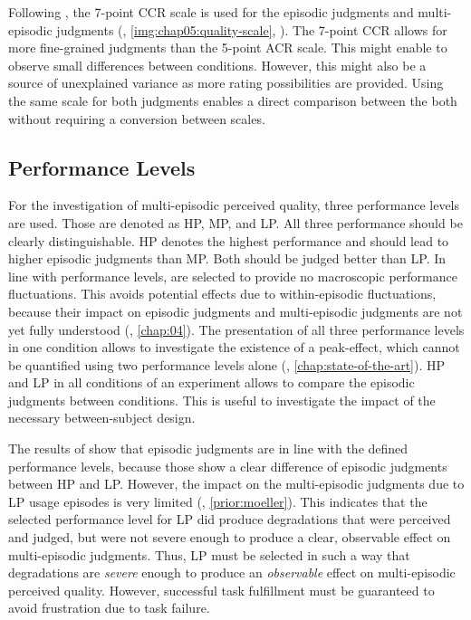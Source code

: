Following \citet{moller_single-call_2011}, the 7-point \acf{CCR} scale is used for the episodic judgments and multi-episodic judgments (\cf, \autoref{img:chap05:quality-scale}, ).
The 7-point \ac{CCR} allows for more fine-grained judgments than the 5-point \ac{ACR} scale.
This might enable to observe small differences between conditions.
However, this might also be a source of unexplained variance as more rating possibilities are provided.
Using the same scale for both judgments enables a direct comparison between the both without requiring a conversion between scales.

\subsection{Performance Levels}
For the investigation of multi-episodic perceived quality, three performance levels are used.
Those are denoted as \acf{HP}, \acf{MP}, and \acf{LP}.
All three performance should be clearly distinguishable.
\ac{HP} denotes the highest performance and should lead to higher episodic judgments than \ac{MP}.
Both should be judged better than \ac{LP}.
In line with \citet{moller_single-call_2011} performance levels, are selected to provide no macroscopic performance fluctuations.
This avoids potential effects due to within-episodic fluctuations, because their impact on episodic judgments and multi-episodic judgments are not yet fully understood (\cf, \autoref{chap:04}).
The presentation of all three performance levels in one condition allows to investigate the existence of a peak-effect, which cannot be quantified using two performance levels alone (\cf, \autoref{chap:state-of-the-art}).
\ac{HP} and \ac{LP} in all conditions of an experiment allows to compare the episodic judgments between conditions.
This is useful to investigate the impact of the necessary between-subject design.

The results of \citet{moller_single-call_2011} show that episodic judgments are in line with the defined performance levels, because those show a clear difference of episodic judgments between \ac{HP} and \ac{LP}.
However, the impact on the multi-episodic judgments due to \ac{LP} usage episodes is very limited (\cf, \autoref{prior:moeller}).
This indicates that the selected performance level for \ac{LP} did produce degradations that were perceived and judged, but were not severe enough to produce a clear, observable effect on multi-episodic judgments.
Thus, \ac{LP} must be selected in such a way that degradations are \emph{severe} enough to produce an \emph{observable} effect on multi-episodic perceived quality.
However, successful task fulfillment must be guaranteed to avoid frustration due to task failure.

